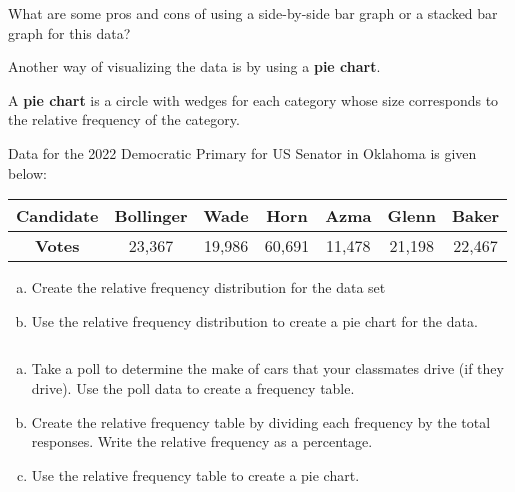 \documentclass[notes]{subfiles}
\begin{document}
		\begin{question}
			What are some pros and cons of using a side-by-side bar graph or a stacked bar graph for this data?
		\end{question}
		
		Another way of visualizing the data is by using a \textbf{pie chart}.
			\newpage

		\begin{defn}
			A \textbf{pie chart} is a circle with wedges for each category whose size corresponds to the relative frequency of the category.
		\end{defn}

		\begin{ex}
			Data for the 2022 Democratic Primary for US Senator in Oklahoma is given below:
			\begin{center}
				{
				\renewcommand{\arraystretch}{1.3}
				\begin{tabular}{|c|c|c|c|c|c|c|}\hline
					\textbf{Candidate} & Bollinger & Wade & Horn & Azma & Glenn & Baker \\ \hline
					\textbf{Votes} & 23,367 & 19,986 & 60,691 & 11,478 & 21,198 & 22,467\\ \hline
				\end{tabular}
				}
			\end{center}
			\begin{enumerate}[(a)]
				\item Create the relative frequency distribution for the data set

				\item Use the relative frequency distribution to create a pie chart for the data.
			\end{enumerate}
		\end{ex}
			\newpage

		\begin{ex}
			$ $
			\begin{enumerate}[(a)]
				\item Take a poll to determine the make of cars that your classmates drive (if they drive).  Use the poll data to create a frequency table.
					\vs{1.5}

				\item Create the relative frequency table by dividing each frequency by the total responses.  Write the relative frequency as a percentage.
					\vs{1}

				\item Use the relative frequency table to create a pie chart.
					\vs{1}
			\end{enumerate}
		\end{ex}
			\newpage

\clearpage
\end{document}
